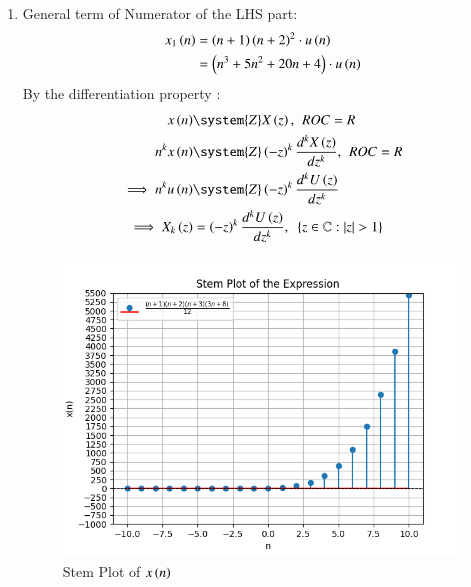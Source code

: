 \documentclass[journal,12pt,twocolumn]{IEEEtran}
\theoremstyle{remark}
\begin{document}
\begin{enumerate}[label=\arabic*.]
\item General term of Numerator of the LHS part:
\begin{align}
    x_1\left(n\right) &= \left(n+1\right)\left(n+2\right)^{2}\cdot u\left(n\right) \\
                &= \left(n^{3} + 5n^{2} + 20n + 4\right) \cdot u\left(n\right)\label{eq:11.9.5.26.1} 
\end{align}
By the differentiation property :
\begin{align}
x\brak{n} &\system{Z} X\brak{z},\hspace{4pt} ROC = R\\
n^k x\brak{n} &\system{Z} \brak{-z}^k \frac{d^kX\brak{z}}{dz^k},\hspace{4pt} ROC = R \\
\implies n^k u\brak{n} &\system{Z} \brak{-z}^k \frac{d^kU\brak{z}}{dz^k}\\
    \implies X_k\brak{z} &=  \brak{-z}^k \frac{d^kU\brak{z}}{dz^k} , \hspace{5pt}  \cbrak{z\in\mathbb{C} : \lvert z \rvert > 1} \label{eq:11.9.5.26.2} 
\end{align}

\begin{figure}[h]
    \hspace{1cm}
    \includegraphics[width=1\columnwidth]{Figure_1.png}
    \caption{Stem Plot of $x\left(n\right)$}
\end{figure}


\end{enumerate}
\end{document}
